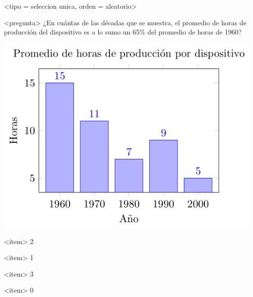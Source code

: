 <tipo = seleccion unica, orden = aleatorio>

<pregunta>
¿En cuántas de las décadas que se muestra, el promedio de horas de producción del dispositivo es a lo sumo un 65\% del promedio de horas de 1960?
\begin{center}
  \includegraphics[scale=0.5]{../promedio.png}
\end{center}

<item>
2

<item>
1

<item>
3

<item>
0


